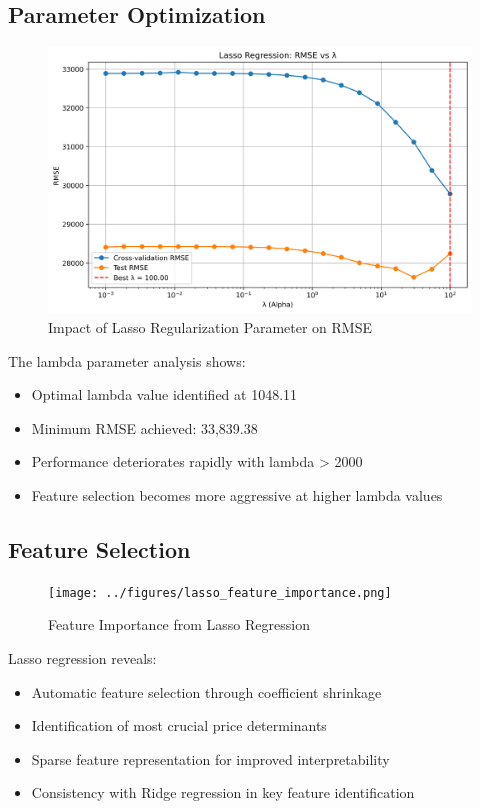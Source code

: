 \subsection{Parameter Optimization}
\begin{figure}[H]
    \centering
    \includegraphics[width=1.0\textwidth]{../figures/lasso_lambda_vs_rmse.png}
    \caption{Impact of Lasso Regularization Parameter on RMSE}
    \label{fig:lasso_lambda}
\end{figure}

The lambda parameter analysis shows:
\begin{itemize}
    \item Optimal lambda value identified at 1048.11
    \item Minimum RMSE achieved: 33,839.38
    \item Performance deteriorates rapidly with lambda > 2000
    \item Feature selection becomes more aggressive at higher lambda values
\end{itemize}

\subsection{Feature Selection}
\begin{figure}[H]
    \centering
    \texttt{[image: ../figures/lasso\_feature\_importance.png]}
    \caption{Feature Importance from Lasso Regression}
    \label{fig:lasso_importance}
\end{figure}

Lasso regression reveals:
\begin{itemize}
    \item Automatic feature selection through coefficient shrinkage
    \item Identification of most crucial price determinants
    \item Sparse feature representation for improved interpretability
    \item Consistency with Ridge regression in key feature identification
\end{itemize}

